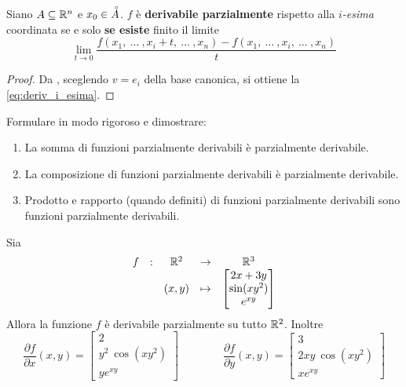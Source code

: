 \begin{proposition}
	Siano $A \subseteq \mathbb{R}^n$ e $x_0 \in \accentset{\circ}{A}$. $f$ è \textbf{derivabile parzialmente} rispetto alla $i$\textit{-esima} coordinata se e solo \textbf{se esiste} finito il limite
	\begin{equation}
		\label{eq:deriv_i_esima}
		\lim\limits_{t \to 0} \frac{f(x_1,\:\dotsc\:,x_i+t,\:\dotsc\:,x_n) - f(x_1,\:\dotsc\:,x_i,\:\dotsc\:,x_n)}{t}
	\end{equation}
	\begin{proof}
		Da , sceglendo $v = e_i$ della base canonica, si ottiene la \cref{eq:deriv_i_esima}.
	\end{proof}
\end{proposition}
\begin{exercise}
	\label{ex:funz_derivabili}
	Formulare in modo rigoroso e dimostrare:
	\begin{enumerate}
		\item La somma di funzioni parzialmente derivabili è parzialmente derivabile.
		\item La composizione di funzioni parzialmente derivabili è parzialmente derivabile.
		\item Prodotto e rapporto (quando definiti) di funzioni parzialmente derivabili sono funzioni parzialmente derivabili.
	\end{enumerate}
\end{exercise}
\begin{example}
	Sia
	\[
		\begin{array}{ccccc} {f} & : & {\mathbb{R}^2} & \to & {\mathbb{R}^3} \\ & & {(x,y)} & \mapsto & {
			\begin{bmatrix}
				2x + 3y\\
				\sin (xy^2)\\
				e^{xy}
			\end{bmatrix}
		} \\ \end{array}
	\]
	Allora la funzione $f$ è derivabile parzialmente su tutto $\mathbb{R}^2$. Inoltre
	\[
		\frac{\partial f}{\partial x}(x,y) =
		\begin{bmatrix}
			2\\
			y^2 \: \cos (xy^2)\\
			y e^{xy}
		\end{bmatrix}
		\qquad\qquad
		\frac{\partial f}{\partial y}(x,y) =
		\begin{bmatrix}
			3\\
			2xy \: \cos (xy^2)\\
			x e^{xy}
		\end{bmatrix}
	\]
\end{example}

